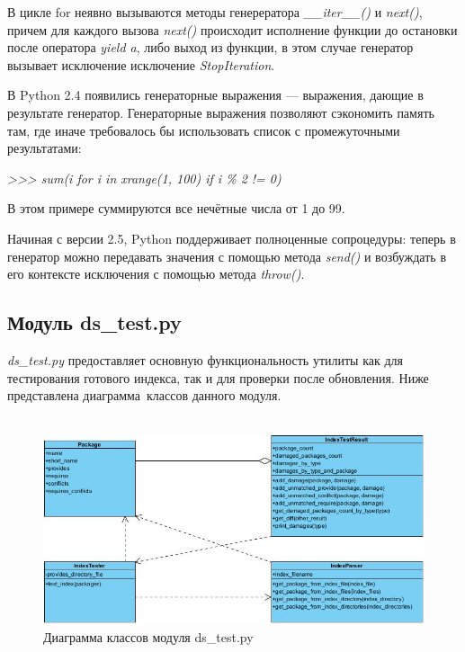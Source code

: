 В цикле for неявно вызываются методы генерератора \textit{\_\_iter\_\_()} и \textit{next()},
причем для каждого вызова \textit{next()} происходит исполнение функции до остановки после 
оператора \textit{yield a}, либо выход из функции, в этом случае генератор 
вызывает исключение исключение \textit{StopIteration}.

В Python 2.4 появились генераторные выражения — выражения, дающие в результате генератор. 
Генераторные выражения позволяют сэкономить память там, где иначе требовалось бы использовать список с промежуточными результатами:

\textit{ >>> sum(i for i in xrange(1, 100) if i \% 2 != 0)}

В этом примере суммируются все нечётные числа от 1 до 99.

Начиная с версии 2.5, Python поддерживает полноценные сопроцедуры: теперь в генератор можно передавать значения 
с помощью метода \textit{send()} и возбуждать в его контексте исключения с помощью метода \textit{throw()}.

\subsection{Модуль ds\_test.py}
\textit{ds\_test.py} предоставляет основную функциональность утилиты  как для тестирования
готового индекса, так и для проверки после обновления. Ниже представлена диаграмма~классов данного модуля.\\

\\
\begin{figure}[!ht]
\begin{center}
\includegraphics[scale=0.6, clip]{../resources/uml/ds_test_class_diagram.jpg}
\caption{Диаграмма классов модуля ds\_test.py}
\label{gr:dstestclassdiag}
\end{center}
\end{figure}

